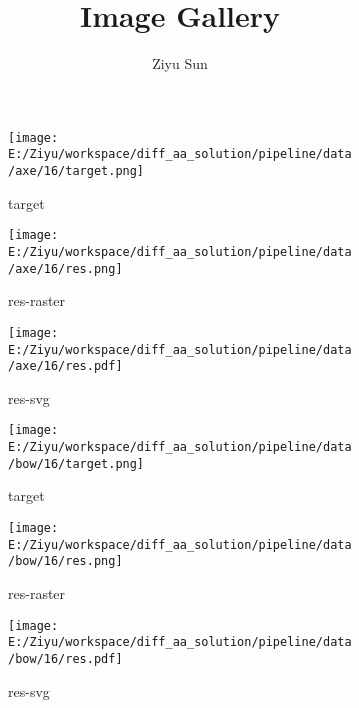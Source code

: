 \documentclass{article}%
\title{Image Gallery}%
\author{Ziyu Sun}%
\begin{document}
%
\normalsize%
\maketitle%
\newpage%


\begin{figure}[H]%
\begin{subfigure}[b]{0.32\linewidth}%
\texttt{[image: E:/Ziyu/workspace/diff\_aa\_solution/pipeline/data/axe/16/target.png]}%
\caption{target}%
\end{subfigure}%
\begin{subfigure}[b]{0.32\linewidth}%
\texttt{[image: E:/Ziyu/workspace/diff\_aa\_solution/pipeline/data/axe/16/res.png]}%
\caption{res{-}raster}%
\end{subfigure}%
\begin{subfigure}[b]{0.32\linewidth}%
\texttt{[image: E:/Ziyu/workspace/diff\_aa\_solution/pipeline/data/axe/16/res.pdf]}%
\caption{res{-}svg}%
\end{subfigure}%
\par\vspace{1em}%
\caption{}%
\end{figure}

%


\begin{figure}[H]%
\begin{subfigure}[b]{0.32\linewidth}%
\texttt{[image: E:/Ziyu/workspace/diff\_aa\_solution/pipeline/data/bow/16/target.png]}%
\caption{target}%
\end{subfigure}%
\begin{subfigure}[b]{0.32\linewidth}%
\texttt{[image: E:/Ziyu/workspace/diff\_aa\_solution/pipeline/data/bow/16/res.png]}%
\caption{res{-}raster}%
\end{subfigure}%
\begin{subfigure}[b]{0.32\linewidth}%
\texttt{[image: E:/Ziyu/workspace/diff\_aa\_solution/pipeline/data/bow/16/res.pdf]}%
\caption{res{-}svg}%
\end{subfigure}%
\par\vspace{1em}%
\caption{}%
\end{figure}

%
\end{document}
